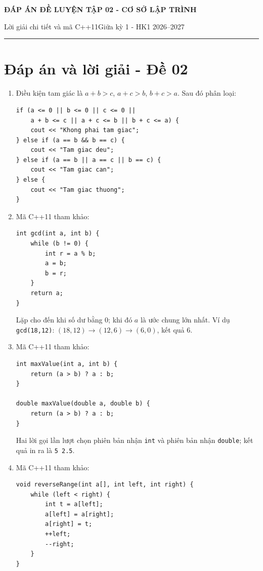 \documentclass[11pt,a4paper]{article}
\newcommand{\examtitle}[4]{\begin{center}{\Large\bfseries\color{hcmusblue}#1}\par\vspace{3pt}{\large\bfseries #2}\par\vspace{3pt}\small #3\quad\textbullet\quad #4\end{center}\vspace{5pt}\hrule\vspace{8pt}}
\begin{document}
\small
\examtitle{ĐÁP ÁN ĐỀ LUYỆN TẬP 02 - CƠ SỞ LẬP TRÌNH}{CƠ SỞ LẬP TRÌNH - HCMUS (theo lịch học tuần 1--5)}{Lời giải chi tiết và mã C++11}{Giữa kỳ 1 - HK1 2026--2027}

\section*{Đáp án và lời giải - Đề 02}
\begin{enumerate}
\item \begin{minipage}[t]{\linewidth}
\begin{minipage}[t]{\linewidth}
Điều kiện tam giác là $a+b>c$, $a+c>b$, $b+c>a$. Sau đó phân loại:
\begin{lstlisting}
if (a <= 0 || b <= 0 || c <= 0 ||
    a + b <= c || a + c <= b || b + c <= a) {
    cout << "Khong phai tam giac";
} else if (a == b && b == c) {
    cout << "Tam giac deu";
} else if (a == b || a == c || b == c) {
    cout << "Tam giac can";
} else {
    cout << "Tam giac thuong";
}
\end{lstlisting}
\end{minipage}
\end{minipage}
\item \begin{minipage}[t]{\linewidth}
\begin{minipage}[t]{\linewidth}
Mã C++11 tham khảo:
\begin{lstlisting}
int gcd(int a, int b) {
    while (b != 0) {
        int r = a % b;
        a = b;
        b = r;
    }
    return a;
}
\end{lstlisting}
Lặp cho đến khi số dư bằng 0; khi đó $a$ là ước chung lớn nhất. Ví dụ \texttt{gcd(18,12)}: $(18,12)\to(12,6)\to(6,0)$, kết quả 6.
\end{minipage}
\end{minipage}
\item \begin{minipage}[t]{\linewidth}
\begin{minipage}[t]{\linewidth}
Mã C++11 tham khảo:
\begin{lstlisting}
int maxValue(int a, int b) {
    return (a > b) ? a : b;
}

double maxValue(double a, double b) {
    return (a > b) ? a : b;
}
\end{lstlisting}
Hai lời gọi lần lượt chọn phiên bản nhận \texttt{int} và phiên bản nhận \texttt{double}; kết quả in ra là \texttt{5 2.5}.
\end{minipage}
\end{minipage}
\item \begin{minipage}[t]{\linewidth}
\begin{minipage}[t]{\linewidth}
Mã C++11 tham khảo:
\begin{lstlisting}
void reverseRange(int a[], int left, int right) {
    while (left < right) {
        int t = a[left];
        a[left] = a[right];
        a[right] = t;
        ++left;
        --right;
    }
}


\end{lstlisting}
\end{minipage}
\end{minipage}
\end{enumerate}
\end{document}
